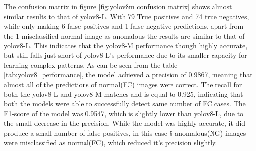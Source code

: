 The confusion matrix in figure \ref{fig:yolov8m confusion matrix} shows almost similar results to that of \gls{yolo}v8-L. With 79 True positives and 74 true negatives, while only making 6 false positives and 1 false negative predictions, apart from the 1 misclassified normal image as anomalous the results are similar to that of \gls{yolo}v8-L. This indicates that the \gls{yolo}v8-M performance though highly accurate, but still falls just short of \gls{yolo}v8-L's performance due to its smaller capacity for learning complex patterns. As can be seen from the table \ref{tab:yolov8_performance}, the model achieved a precision of 0.9867, meaning that almost all of the predictions of normal(FC) images were correct. The recall for both the \gls{yolo}v8-L and \gls{yolo}v8-M matches and is equal to 0.925, indicating that both the models were able to successfully detect same number of FC cases. The F1-score of the model was 0.9547, which is slightly lower than \gls{yolo}v8-L, due to the small decrease in the precision. While the model was highly accurate, it did produce a small number of false positives, in this case 6 anomalous(NG) images were misclassified as normal(FC), which reduced it's precision slightly.





